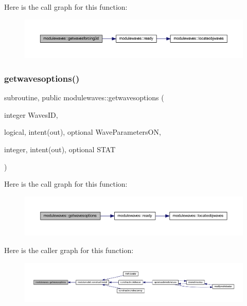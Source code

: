 Here is the call graph for this function\+:\nopagebreak
\begin{figure}[H]
\begin{center}
\leavevmode
\includegraphics[width=350pt]{namespacemodulewaves_a53569d674a6deea3e1da241680a758b3_cgraph}
\end{center}
\end{figure}
\mbox{\label{namespacemodulewaves_af1623a677ea698d686e5a5faa283eea1}} 
\subsubsection{\texorpdfstring{getwavesoptions()}{getwavesoptions()}}
{\footnotesize\ttfamily subroutine, public modulewaves\+::getwavesoptions (\begin{DoxyParamCaption}\item[{integer}]{Waves\+ID,  }\item[{logical, intent(out), optional}]{Wave\+Parameters\+ON,  }\item[{integer, intent(out), optional}]{S\+T\+AT }\end{DoxyParamCaption})}

Here is the call graph for this function\+:\nopagebreak
\begin{figure}[H]
\begin{center}
\leavevmode
\includegraphics[width=350pt]{namespacemodulewaves_af1623a677ea698d686e5a5faa283eea1_cgraph}
\end{center}
\end{figure}
Here is the caller graph for this function\+:\nopagebreak
\begin{figure}[H]
\begin{center}
\leavevmode
\includegraphics[width=350pt]{namespacemodulewaves_af1623a677ea698d686e5a5faa283eea1_icgraph}
\end{center}
\end{figure}
\mbox{\label{namespacemodulewaves_a0fa381ad7f743e71a910cb5aafaea3c4}} 
